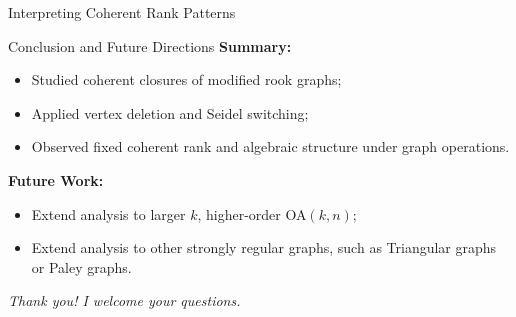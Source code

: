 \documentclass{beamer}
\begin{document}
\begin{frame}{Interpreting Coherent Rank Patterns}

\end{frame}


\begin{frame}{Conclusion and Future Directions}
\textbf{Summary:}
\begin{itemize}
  \item Studied coherent closures of modified rook graphs;
  \item Applied vertex deletion and Seidel switching;
  \item Observed fixed coherent rank and algebraic structure under graph operations.
\end{itemize}

\vspace{1em}
\textbf{Future Work:}
\begin{itemize}
  \item Extend analysis to larger \( k \), higher-order OA$(k,n)$;
  \item Extend analysis to other strongly regular graphs, such as Triangular graphs or Paley graphs.
\end{itemize}

\vspace{1em}
\centering
\textit{Thank you! I welcome your questions.}
\end{frame}




\end{document}
